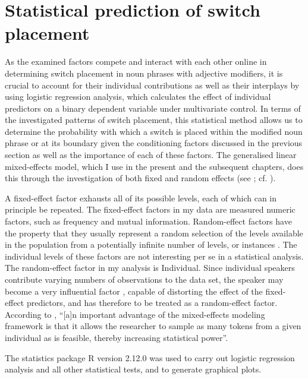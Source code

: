 \section{Statistical prediction of switch placement}\label{4:stat}

As the examined factors compete and interact with each other online in determining switch placement in noun phrases with adjective modifiers, it is crucial to account for their individual contributions as well as their interplays by using logistic regression analysis, which calculates the effect of individual predictors on a binary dependent variable under multivariate control. In terms of the investigated patterns of switch placement, this statistical method allows us to determine the probability with which a switch is placed within the modified noun phrase or at its boundary given the conditioning factors discussed in the previous section as well as the importance of each of these factors. The generalised linear mixed-effects model, which I use in the present and the subsequent chapters, does this through the investigation of both fixed and random effects (see \citealt[278--84]{baayen-analyzing}; cf. \citealt{bresnan-etal}).

A fixed-effect factor exhausts all of its possible levels, each of which can in principle be repeated. The fixed-effect factors in my data are measured numeric factors, such as frequency and mutual information. Random-effect factors have the property that they usually represent a random selection of the levels available in the population from a potentially infinite number of levels, or instances \citep[][241]{baayen-analyzing}. The individual levels of these factors are not interesting per se in a statistical analysis. The random-effect factor in my analysis is Individual. Since individual speakers contribute varying numbers of observations to the data set, the speaker may become a very influential factor \citep[][]{tagliamonte-baayen-2012}, capable of distorting the effect of the fixed-effect predictors, and has therefore to be treated as a random-effect factor. According to \citet[158]{tagliamonte-baayen-2012}, ``[a]n important advantage of the mixed-effects modeling framework is that it allows the researcher to sample as many tokens from a given individual as is feasible, thereby increasing statistical power''. 

The statistics package R version 2.12.0 \citep{r} was used to carry out logistic regression analysis and all other statistical tests, and to generate graphical plots.

